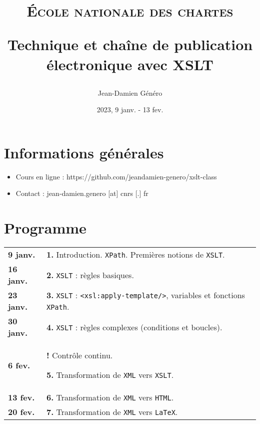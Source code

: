 \documentclass[a4paper]{article}
\title{\textsc{École nationale des chartes}

\bigskip

Technique et chaîne de publication électronique avec XSLT}
\author{Jean-Damien Généro}
\date{2023, 9 janv. - 13 fev.}
\begin{document}
\maketitle

\section*{Informations générales}

\begin{itemize}
    \item Cours en ligne : https://github.com/jeandamien-genero/xslt-class
    \item Contact : jean-damien.genero [at] cnrs [.] fr
\end{itemize}

\bigskip

\section*{Programme}

\renewcommand{\arraystretch}{1.5}
\begin{center}
    \begin{tabular}[h]{|p{1.5cm} p{9.6cm}}
        \textbf{9 janv.} & \textbf{1.} Introduction. \texttt{XPath}. Premières notions de \texttt{XSLT}.\\
        \textbf{16 janv.} & \textbf{2.} \texttt{XSLT} : règles basiques.  \\
        \textbf{23 janv.} & \textbf{3.} \texttt{XSLT} : \texttt{<xsl:apply-template/>}, variables et fonctions \texttt{XPath}. \\
        \textbf{30 janv.} & \textbf{4.} \texttt{XSLT} : règles complexes (conditions et boucles). \\
        \textbf{6 fev.} & \textbf{!}  Contrôle continu.
        
        \textbf{5.} Transformation de \texttt{XML}  vers \texttt{XSLT}. \\
        \textbf{13 fev.} & \textbf{6.} Transformation de \texttt{XML}  vers \texttt{HTML}. \\
        \textbf{20 fev.} & \textbf{7.} Transformation de \texttt{XML}  vers \texttt{LaTeX}. \\
    \end{tabular}
\end{center}

\bigskip
\end{document}
